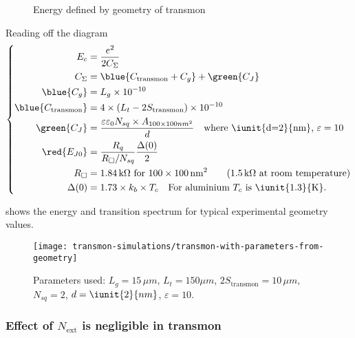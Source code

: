 \begin{figure}[h]
  \centering {}
  \caption{\small     Energy      defined     by      geometry     of
    transmon\label{fig:cooper_pair_box_5_geometry}}
\end{figure}

Reading off the diagram
\begin{equation}
  \left\{
    \begin{aligned}
      E_c& = \frac{e^2}{2C_\Sigma}\\
      C_{\Sigma} & = \blue{C_\text{transmon} + C_g}+ \green{C_J}\\
      \blue{C_{g}} & = L_{g} \times 10^{-10}\\
      \blue{C_{\text{transmon}}} & = 4\times\left( L_{t} - 2S_{\text{transmon}} \right) \times 10^{-10}\\
      \green{C_J}   &    =   \frac{\varepsilon\varepsilon_0N_{sq}   \times
        A_{100\times100nm^2}}{d} \quad
      \text{where \iunit{d=2}{nm}, $\varepsilon = 10$}\\
      \red{E_{J0}} & = \frac{R_q}{R_{\square}/N_{sq}}\frac{\Delta(0)}{2}\\
      R_{\square} & = 1.84\,\text{k}\Omega \text{ for }100 \times 100\,\text{nm}^2 \qquad (1.5\,\text{k}\Omega \text{ at room temperature})\\
      \Delta(0)  &  =   1.73  \times  k_{b}  \times  T_{c}   \quad  \text{For  aluminium
        $T_{c}$ is \iunit{1.3}{K}}.
    \end{aligned}\right.
\end{equation}

 shows the energy
and transition spectrum for typical experimental geometry values.

\begin{figure}[h]
  \centering
  \texttt{[image: transmon-simulations/transmon-with-parameters-from-geometry]}
  \caption{\small   Parameters    used:   $L_{g}   =    15\,\mu   m$,
    $L_{t}  =   150\mu  m$,   $2S_{\text{transmon}}  =   10\,\mu  m$,
    $N_{sq}=2$,     $d    =     \iunit{2}{nm}$,    $\varepsilon     =
    10$. \label{fig:transmon-with-parameters-from-geometry}}
\end{figure}

\subsubsection{Effect of $N_{\text{ext}}$ is negligible in transmon}
\label{sec:effect-n_textext}


